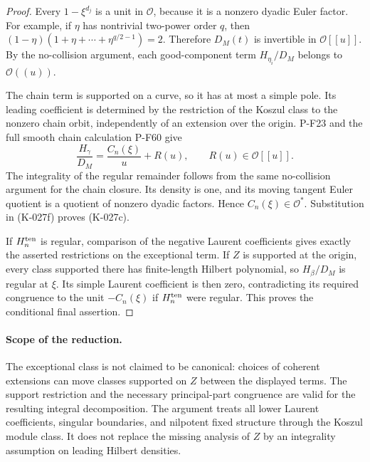 \begin{proof}
Every $1-\xi^{d_j}$ is a unit in $\mathcal O$, because it is a
nonzero dyadic Euler factor.  For example, if $\eta$ has nontrivial
two-power order $q$, then
$(1-\eta)(1+\eta+\cdots+\eta^{q/2-1})=2$.
Therefore $D_M(t)$ is invertible in $\mathcal O[[u]]$.  By the
no-collision argument, each good-component term
$H_{\eta_i}/D_M$ belongs to $\mathcal O((u))$.

The chain term is supported on a curve, so it has at most a simple
pole.  Its leading coefficient is determined by the restriction of
the Koszul class to the nonzero chain orbit, independently of an
extension over the origin.  P-F23 and the full smooth chain
calculation P-F60 give
\[
                 \frac{H_\gamma}{D_M}
                      =\frac{C_n(\xi)}{u}+R(u),
                 \qquad R(u)\in\mathcal O[[u]].
\]
The integrality of the regular remainder follows from the same
no-collision argument for the chain closure.  Its density is one,
and its moving tangent Euler quotient is a quotient of nonzero
dyadic factors.  Hence $C_n(\xi)\in\mathcal O^*$.
Substitution in (K-027f) proves (K-027c).

If $H_n^{\rm ten}$ is regular, comparison of the negative Laurent
coefficients gives exactly the asserted restrictions on the
exceptional term.  If $Z$ is supported at the origin, every class
supported there has finite-length Hilbert polynomial, so
$H_\beta/D_M$ is regular at $\xi$.  Its simple Laurent coefficient
is then zero, contradicting its required congruence to the unit
$-C_n(\xi)$ if $H_n^{\rm ten}$ were regular.  This proves the
conditional final assertion.
\end{proof}

\paragraph{Scope of the reduction.}
The exceptional class is not claimed to be canonical: choices of
coherent extensions can move classes supported on $Z$ between the
displayed terms.  The support restriction and the necessary
principal-part congruence are valid for the resulting integral
decomposition.  The argument treats all lower Laurent coefficients,
singular boundaries, and nilpotent fixed structure through the
Koszul module class.  It does not replace the missing analysis of
$Z$ by an integrality assumption on leading Hilbert densities.
